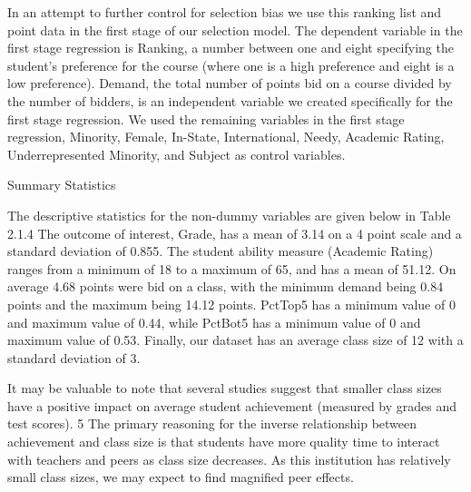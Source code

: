 \documentclass[12pt,a4paper,english,fleqn]{article}
\makeatletter
\renewcommand\subsection{\@startsection{subsection}{2}
{\z@}{-3.25ex\@plus -1ex \@minus -.2ex}{1.5ex \@plus .2ex}{\normalfont\bf}}
\makeatother
\begin{document}
In an attempt to further control for selection bias we use this ranking list and point data in the first stage of our selection model. The dependent variable in the first stage regression is Ranking, a number between one and eight specifying the student's preference for the course (where one is a high preference and eight is a low preference). Demand, the total number of points bid on a course divided by the number of bidders, is an independent variable we created specifically for the first stage regression. We used the remaining variables in the first stage regression, Minority, Female, In-State, International, Needy, Academic Rating, Underrepresented Minority, and Subject as control variables. 
\subsection{Summary Statistics}

The descriptive statistics for the non-dummy variables are given below in Table 2.1.4 The outcome of interest, Grade, has a mean of 3.14 on a 4 point scale and a standard deviation of 0.855. The student ability measure (Academic Rating) ranges from a minimum of 18 to a maximum of 65, and has a mean of 51.12. On average 4.68 points were bid on a class, with the minimum demand being 0.84 points and the maximum being 14.12 points. PctTop5 has a minimum value of 0 and maximum value of 0.44, while PctBot5 has a minimum value of 0 and maximum value of 0.53. Finally, our dataset has an average class size of 12 with a standard deviation of 3. 

It may be valuable to note that several studies suggest that smaller class sizes have a positive impact on average student achievement (measured by grades and test scores). 5 The primary reasoning for the inverse relationship between achievement and class size is that students have more quality time to interact with teachers and peers as class size decreases. As this institution has relatively small class sizes, we may expect to find magnified peer effects. 



\medskip




\end{document}
